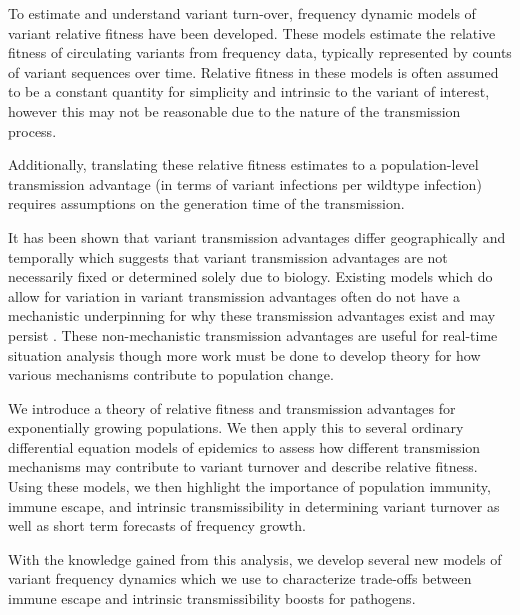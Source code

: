 \documentclass[12pt,oneside,letterpaper]{article}
\begin{document}
To estimate and understand variant turn-over, frequency dynamic models of variant relative fitness have been developed.
These models estimate the relative fitness of circulating variants from frequency data, typically represented by counts of variant sequences over time.
Relative fitness in these models is often assumed to be a constant quantity for simplicity and intrinsic to the variant of interest, however this may not be reasonable due to the nature of the transmission process.

Additionally, translating these relative fitness estimates to a population-level transmission advantage (in terms of variant infections per wildtype infection) requires assumptions on the generation time of the transmission. \cite{Wallinga2006}


It has been shown that variant transmission advantages differ geographically and temporally which suggests that variant transmission advantages are not necessarily fixed or determined solely due to biology.
Existing models which do allow for variation in variant transmission advantages often do not have a mechanistic underpinning for why these transmission advantages exist and may persist \cite{figgins2022sars, susswein2023leveraging}.
These non-mechanistic transmission advantages are useful for real-time situation analysis though more work must be done to develop theory for how various mechanisms contribute to population change.

We introduce a theory of relative fitness and transmission advantages for exponentially growing populations.
We then apply this to several ordinary differential equation models of epidemics to assess how different transmission mechanisms may contribute to variant turnover and describe relative fitness.
Using these models, we then highlight the importance of population immunity, immune escape, and intrinsic transmissibility in determining variant turnover as well as short term forecasts of frequency growth.

With the knowledge gained from this analysis, we develop several new models of variant frequency dynamics which we use to characterize trade-offs between immune escape and intrinsic transmissibility boosts for pathogens.

\end{document}
